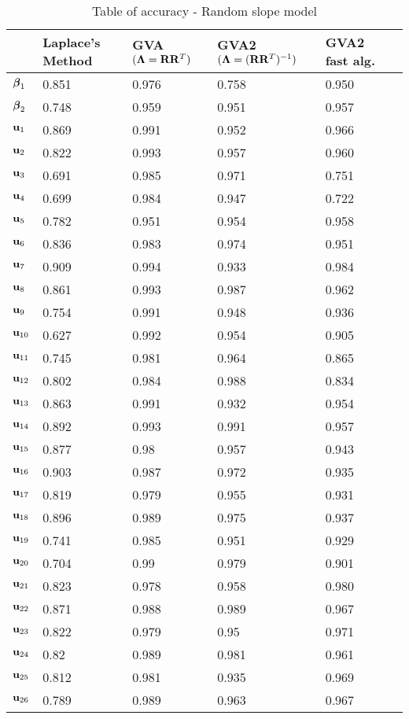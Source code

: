 \documentclass{article}[12pt]
\begin{document}
\begin{table}
\label{tab:accuracy_slope}
\caption{Table of accuracy - Random slope model}
\begin{tabular}{l|lllll}
\hline
& Laplace's Method & GVA $({\boldsymbol \Lambda} = {\bf R} {\bf R}^T)$ & GVA2 $({\boldsymbol \Lambda} = ({\bf R} {\bf R}^T)^{-1})$ & GVA2 fast alg.\\
\hline
${\boldsymbol \beta}_1$     &0.851&0.976&0.758&0.950\\
${\boldsymbol \beta}_2$     &0.748&0.959&0.951&0.957\\
${\bf u}_1$        &0.869&0.991&0.952&0.966\\
${\bf u}_2$        &0.822&0.993&0.957&0.960\\
${\bf u}_3$        &0.691&0.985&0.971&0.751\\
${\bf u}_4$        &0.699&0.984&0.947&0.722\\
${\bf u}_5$        &0.782&0.951&0.954&0.958\\
${\bf u}_6$        &0.836&0.983&0.974&0.951\\
${\bf u}_7$        &0.909&0.994&0.933&0.984\\
${\bf u}_8$        &0.861&0.993&0.987&0.962\\
${\bf u}_9$        &0.754&0.991&0.948&0.936\\
${\bf u}_{10}$     &0.627&0.992&0.954&0.905\\
${\bf u}_{11}$     &0.745&0.981&0.964&0.865\\
${\bf u}_{12}$     &0.802&0.984&0.988&0.834\\
${\bf u}_{13}$     &0.863&0.991&0.932&0.954\\
${\bf u}_{14}$     &0.892&0.993&0.991&0.957\\
${\bf u}_{15}$     &0.877&0.98&0.957&0.943\\
${\bf u}_{16}$     &0.903&0.987&0.972&0.935\\
${\bf u}_{17}$     &0.819&0.979&0.955&0.931\\
${\bf u}_{18}$     &0.896&0.989&0.975&0.937\\
${\bf u}_{19}$     &0.741&0.985&0.951&0.929\\
${\bf u}_{20}$     &0.704&0.99&0.979&0.901\\
${\bf u}_{21}$     &0.823&0.978&0.958&0.980\\
${\bf u}_{22}$     &0.871&0.988&0.989&0.967\\
${\bf u}_{23}$     &0.822&0.979&0.95&0.971\\
${\bf u}_{24}$     &0.82&0.989&0.981&0.961\\
${\bf u}_{25}$     &0.812&0.981&0.935&0.969\\
${\bf u}_{26}$     &0.789&0.989&0.963&0.967\\

\end{tabular}
\end{table}
\end{document}
